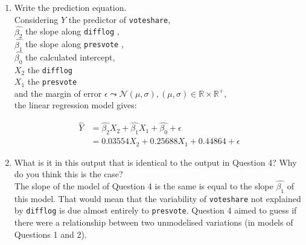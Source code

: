 \documentclass[12pt,letterpaper]{article}
\begin{document}
\begin{enumerate}
		\item Write the prediction equation.	\\
		Considering $\hat{Y}$ the predictor of \texttt{voteshare}, \\ $\hat{\beta_2}$ the slope along \texttt{difflog} ,\\  $\hat{\beta_1}$ the slope along \texttt{presvote} ,\\
			 $\hat{\beta_0}$ the calculated intercept,\\ $X_2$ the  \texttt{difflog} \\ $X_1$ the  \texttt{presvote} \\
			 and the margin of error $\epsilon \leadsto  \mathcal{N} ( \mu, \sigma ), ( \mu, \sigma ) \in \mathds{R}\times \mathds{R}^+$, \\
			 the linear regression model gives:
			
			\begin{align*}
				 \hat{Y} &= \hat{\beta_2} X_2 + \hat{\beta_1} X_1 + \hat{\beta_0} + \epsilon \\
				&=    0.03554 X_2 + 0.25688   X_1 +  0.44864   + \epsilon
			\end{align*}
		\item What is it in this output that is identical to the output in Question 4? Why do you think this is the case?\\
			The slope of the model of Question 4 is the same is equal to the slope  $\hat{\beta_1}$ of this model.
			That would mean that the variability of \texttt{voteshare} not explained by  \texttt{difflog}  is due almost entirely to  \texttt{presvote}. Question 4 aimed to guess 			if there were a relationship between two unmodelised variations (in models of Questions 1 and 2).
	\end{enumerate}
\end{document}
